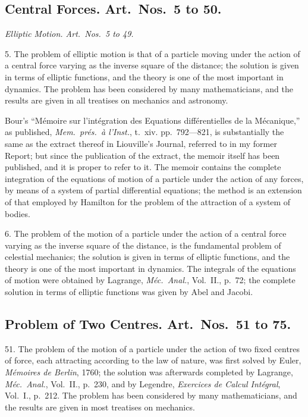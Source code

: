 \documentclass[11pt,a4paper]{book}
\begin{document}
\subsection*{Central Forces. Art.\ Nos.\ 5 to 50.}

\textit{Elliptic Motion. Art.\ Nos.\ 5 to 49.}

5. The problem of elliptic motion is that of a particle moving under the action of a central force varying as the inverse square of the distance; the solution is given in terms of elliptic functions, and the theory is one of the most important in dynamics. The problem has been considered by many mathematicians, and the results are given in all treatises on mechanics and astronomy.

\newpage
\setcounter{page}{515}

Bour's ``M\'emoire sur l'int\'egration des Equations diff\'erentielles de la M\'ecanique,'' as published, \textit{Mem.\ pr\'es.\ \`a l'Inst.}, t.~xiv. pp.~792---821, is substantially the same as the extract thereof in Liouville's Journal, referred to in my former Report; but since the publication of the extract, the memoir itself has been published, and it is proper to refer to it. The memoir contains the complete integration of the equations of motion of a particle under the action of any forces, by means of a system of partial differential equations; the method is an extension of that employed by Hamilton for the problem of the attraction of a system of bodies.

6. The problem of the motion of a particle under the action of a central force varying as the inverse square of the distance, is the fundamental problem of celestial mechanics; the solution is given in terms of elliptic functions, and the theory is one of the most important in dynamics. The integrals of the equations of motion were obtained by Lagrange, \textit{M\'ec.\ Anal.}, Vol.~II., p.~72; the complete solution in terms of elliptic functions was given by Abel and Jacobi.

\subsection*{Problem of Two Centres. Art.\ Nos.\ 51 to 75.}

51. The problem of the motion of a particle under the action of two fixed centres of force, each attracting according to the law of nature, was first solved by Euler, \textit{M\'emoires de Berlin}, 1760; the solution was afterwards completed by Lagrange, \textit{M\'ec.\ Anal.}, Vol.~II., p.~230, and by Legendre, \textit{Exercices de Calcul Int\'egral}, Vol.~I., p.~212. The problem has been considered by many mathematicians, and the results are given in most treatises on mechanics.
\end{document}

